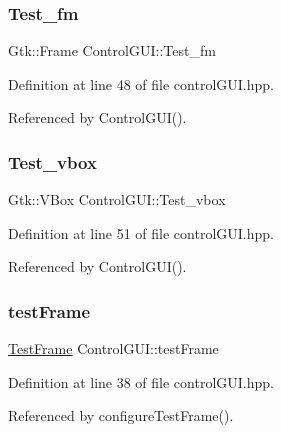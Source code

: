\mbox{\label{class_control_g_u_i_a5d8c401a0a96fd03cb6b2893e1ea9fb4}} 
\subsubsection{\texorpdfstring{Test\+\_\+fm}{Test\_fm}}
{\footnotesize\ttfamily Gtk\+::\+Frame Control\+G\+U\+I\+::\+Test\+\_\+fm}



Definition at line 48 of file control\+G\+U\+I.\+hpp.



Referenced by Control\+G\+U\+I().

\mbox{\label{class_control_g_u_i_a2ff057031f70b0d5b5948b61b55e0679}} 
\subsubsection{\texorpdfstring{Test\+\_\+vbox}{Test\_vbox}}
{\footnotesize\ttfamily Gtk\+::\+V\+Box Control\+G\+U\+I\+::\+Test\+\_\+vbox}



Definition at line 51 of file control\+G\+U\+I.\+hpp.



Referenced by Control\+G\+U\+I().

\mbox{\label{class_control_g_u_i_a0c644077833274625d1ff044e2abdb42}} 
\subsubsection{\texorpdfstring{test\+Frame}{testFrame}}
{\footnotesize\ttfamily \hyperlink{class_test_frame}{Test\+Frame} Control\+G\+U\+I\+::test\+Frame}



Definition at line 38 of file control\+G\+U\+I.\+hpp.



Referenced by configure\+Test\+Frame().

